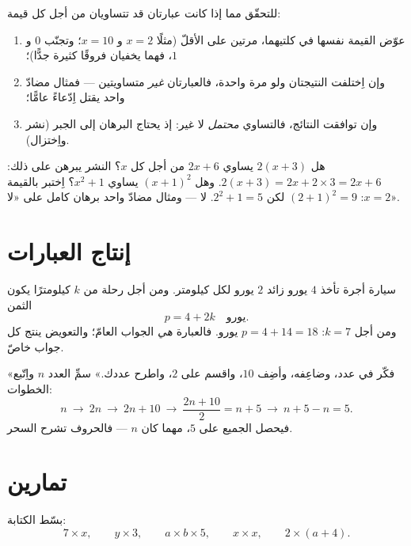 \begin{method}\label{met:g7:literal:test}
للتحقّق مما إذا كانت عبارتان قد تتساويان من أجل كل قيمة:
\begin{enumerate}
  \item عوّض القيمة نفسها في كلتيهما، مرتين على الأقلّ (مثلًا
        $x = 2$ و $x = 10$؛ وتجنّب $0$ و $1$، فهما يخفيان فروقًا
        كثيرة جدًّا)؛
  \item وإن اِختلفت النتيجتان ولو مرة واحدة، فالعبارتان
        \emph{غير} متساويتين --- فمثال مضادّ واحد يقتل اِدّعاءً عامًّا؛
  \item وإن توافقت النتائج، فالتساوي \emph{محتمل} لا غير: إذ
        يحتاج البرهان إلى الجبر (نشر واِختزال).
\end{enumerate}
\end{method}

\begin{example}\label{ex:g7:literal:test}
هل $2(x + 3)$ يساوي $2x + 6$ من أجل كل $x$؟ النشر يبرهن على ذلك:
$2(x+3) = 2x + 2 \times 3 = 2x + 6$. وهل $(x + 1)^2$ يساوي
$x^2 + 1$؟ اِختبر بالقيمة $x = 2$: $(2+1)^2 = 9$ لكن $2^2 + 1 = 5$. لا ---
ومثال مضادّ واحد برهان كامل على «لا».
\end{example}

\section{إنتاج العبارات}

\begin{example}\label{ex:g7:literal:produce}
سيارة أجرة تأخذ $4$ يورو زائد $2$ يورو لكل كيلومتر. ومن أجل رحلة من
$k$ كيلومترًا يكون الثمن
\[
p = 4 + 2k \quad\text{يورو}.
\]
ومن أجل $k = 7$: $p = 4 + 14 = 18$ يورو. فالعبارة \emph{هي} الجواب
العامّ؛ والتعويض ينتج كل جواب خاصّ.
\end{example}

\begin{example}\label{ex:g7:literal:trick}
«فكّر في عدد، وضاعِفه، وأضِف $10$، واقسم على $2$، واطرح
عددك.» سمِّ العدد $n$ واِتّبع الخطوات:
\[
n \ \to\ 2n \ \to\ 2n + 10 \ \to\ \frac{2n + 10}{2} = n + 5 \ \to\
n + 5 - n = 5 .
\]
فيحصل الجميع على $5$، مهما كان $n$ --- فالحروف تشرح
السحر.
\end{example}

\section{تمارين}

\begin{exercise}[$\star$]\label{exo:g7:literal:1}
بسّط الكتابة:
\[
7 \times x, \qquad
y \times 3, \qquad
a \times b \times 5, \qquad
x \times x, \qquad
2 \times (a + 4).
\]
\end{exercise}

